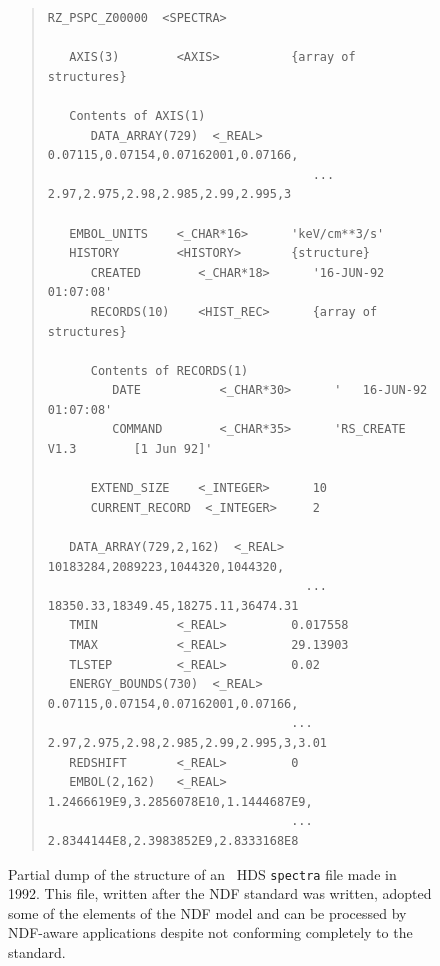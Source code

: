 \documentclass[final,authoryear,5p,times,twocolumn]{elsarticle}
\begin{document}
\begin{figure}[t]
\begin{minipage}{\textwidth}
\begin{quote}
\small
\begin{verbatim}
RZ_PSPC_Z00000  <SPECTRA>

   AXIS(3)        <AXIS>          {array of structures}

   Contents of AXIS(1)
      DATA_ARRAY(729)  <_REAL>       0.07115,0.07154,0.07162001,0.07166,
                                     ... 2.97,2.975,2.98,2.985,2.99,2.995,3

   EMBOL_UNITS    <_CHAR*16>      'keV/cm**3/s'
   HISTORY        <HISTORY>       {structure}
      CREATED        <_CHAR*18>      '16-JUN-92 01:07:08'
      RECORDS(10)    <HIST_REC>      {array of structures}

      Contents of RECORDS(1)
         DATE           <_CHAR*30>      '   16-JUN-92 01:07:08'
         COMMAND        <_CHAR*35>      'RS_CREATE V1.3        [1 Jun 92]'

      EXTEND_SIZE    <_INTEGER>      10
      CURRENT_RECORD  <_INTEGER>     2

   DATA_ARRAY(729,2,162)  <_REAL>   10183284,2089223,1044320,1044320,
                                    ... 18350.33,18349.45,18275.11,36474.31
   TMIN           <_REAL>         0.017558
   TMAX           <_REAL>         29.13903
   TLSTEP         <_REAL>         0.02
   ENERGY_BOUNDS(730)  <_REAL>    0.07115,0.07154,0.07162001,0.07166,
                                  ... 2.97,2.975,2.98,2.985,2.99,2.995,3,3.01
   REDSHIFT       <_REAL>         0
   EMBOL(2,162)   <_REAL>         1.2466619E9,3.2856078E10,1.1444687E9,
                                  ... 2.8344144E8,2.3983852E9,2.8333168E8
\end{verbatim}
\end{quote}
\caption{Partial dump of the structure of an \asterix\ HDS
  \texttt{spectra} file made in 1992. This file, written after the NDF
  standard was written, adopted some of the elements of the
  NDF model and can be processed by NDF-aware applications despite not
  conforming completely to the standard.}
\label{fig:duck}
\end{minipage}
\end{figure}
\end{document}
